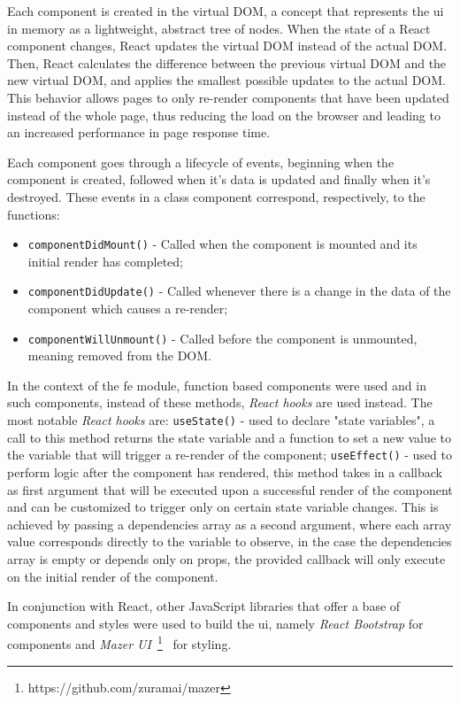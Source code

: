 Each component is created in the virtual DOM, a concept that represents the \acrshort{ui} in memory as a lightweight, abstract tree of nodes. When the state of a React component changes, React updates the virtual DOM instead of the actual DOM. Then, React calculates the difference between the previous virtual DOM and the new virtual DOM, and applies the smallest possible updates to the actual DOM. This behavior allows pages to only re-render components that have been updated instead of the whole page, thus reducing the load on the browser and leading to an increased performance in page response time.

Each component goes through a lifecycle of events, beginning when the component is created, followed when it's data is updated and finally when it's destroyed. These events in a class component correspond, respectively, to the functions:
\begin{itemize}
    \item \lstinline{componentDidMount()} - Called when the component is mounted and its initial render has completed;
    \item \lstinline{componentDidUpdate()} - Called whenever there is a change in the data of the component which causes a re-render;
    \item \lstinline{componentWillUnmount()} - Called before the component is unmounted, meaning removed from the DOM.
\end{itemize}

In the context of the \acrshort{fe} module, function based components were used and in such components, instead of these methods, \textit{React hooks} are used instead. The most notable \textit{React hooks} are: \lstinline{useState()} - used to declare "state variables", a call to this method returns the state variable and a function to set a new value to the variable that will trigger a re-render of the component; \lstinline{useEffect()} - used to perform logic after the component has rendered, this method takes in a callback as first argument that will be executed upon a successful render of the component and can be customized to trigger only on certain state variable changes. This is achieved by passing a dependencies array as a second argument, where each array value corresponds directly to the variable to observe, in the case the dependencies array is empty or depends only on props, the provided callback will only execute on the initial render of the component.

In conjunction with React, other JavaScript libraries that offer a base of components and styles were used to build the \acrshort{ui}, namely \textit{React Bootstrap} for components and \textit{Mazer UI}~\footnote{https://github.com/zuramai/mazer}~\label{fn:mazer-ui} for styling.

